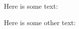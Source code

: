 \documentclass{article}
\begin{document}
Here is some text:

\exampleN


Here is some other text:

\exampleTwoN

\end{document}
